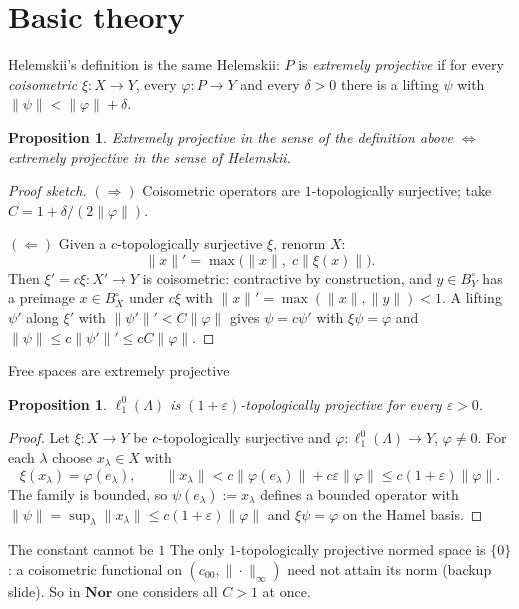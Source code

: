 \documentclass[10pt,aspectratio=169]{beamer}
\newtheorem{proposition}[theorem]{Proposition}
\newcommand{\Nor}{\mathbf{Nor}}
\newcommand{\lo}[1]{\ell_1^0(#1)}
\begin{document}
\section{Basic theory}

\begin{frame}{Helemskii's definition is the same}
  Helemskii: $P$ is \emph{extremely projective} if for every \emph{coisometric}
  $\xi\colon X\to Y$, every $\varphi\colon P\to Y$ and every $\delta>0$ there
  is a lifting $\psi$ with $\|\psi\|<\|\varphi\|+\delta$.
  \begin{proposition}
    Extremely projective in the sense of the definition above $\iff$
    extremely projective in the sense of Helemskii.
  \end{proposition}
  \begin{proof}[Proof sketch]
    $(\Rightarrow)$ Coisometric operators are $1$-topologically surjective;
    take $C=1+\delta/(2\|\varphi\|)$.

    $(\Leftarrow)$ Given a $c$-topologically surjective $\xi$, renorm $X$:
    \[
      \|x\|'=\max\bigl(\|x\|,\;c\|\xi(x)\|\bigr).
    \]
    Then $\xi'=c\xi\colon X'\to Y$ is coisometric: contractive by construction,
    and $y\in B_Y^\circ$ has a preimage $x\in B_X^\circ$ under $c\xi$ with
    $\|x\|'=\max(\|x\|,\|y\|)<1$. A lifting $\psi'$ along $\xi'$ with
    $\|\psi'\|'<C\|\varphi\|$ gives $\psi=c\psi'$ with $\xi\psi=\varphi$ and
    $\|\psi\|\le c\|\psi'\|'\le cC\|\varphi\|$.
  \end{proof}

\end{frame}

\begin{frame}{Free spaces are extremely projective}
  \begin{proposition}
    $\lo\Lambda$ is $(1+\varepsilon)$-topologically projective for every
    $\varepsilon>0$.
  \end{proposition}
  \begin{proof}
    Let $\xi\colon X\to Y$ be $c$-topologically surjective and
    $\varphi\colon\lo\Lambda\to Y$, $\varphi\ne0$. For each $\lambda$ choose
    $x_\lambda\in X$ with
    \[
      \xi(x_\lambda)=\varphi(e_\lambda),\qquad
      \|x_\lambda\|<c\|\varphi(e_\lambda)\|+c\varepsilon\|\varphi\|\le c(1+\varepsilon)\|\varphi\| .
    \]
    The family is bounded, so $\psi(e_\lambda):=x_\lambda$ defines a bounded
    operator with $\|\psi\|=\sup_\lambda\|x_\lambda\|\le c(1+\varepsilon)\|\varphi\|$
    and $\xi\psi=\varphi$ on the Hamel basis.
  \end{proof}
  \begin{alertblock}{The constant cannot be $1$}
    The only $1$-topologically projective normed space is $\{0\}$: a
    coisometric functional on $(c_{00},\|\cdot\|_\infty)$ need not attain its
    norm (backup slide). So in $\Nor$ one considers all $C>1$ at once.
  \end{alertblock}
\end{frame}
\end{document}
